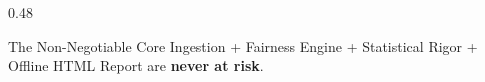 \begin{frame}
\begin{columns}[T]
\begin{column}{0.48\textwidth}
      \vspace{0.1cm}
      \begin{successcard}{The Non-Negotiable Core}
        \scriptsize Ingestion + Fairness Engine + Statistical Rigor + Offline HTML Report are \textbf{never at risk}.
      \end{successcard}
    \end{column}
  \end{columns}
\end{frame}
